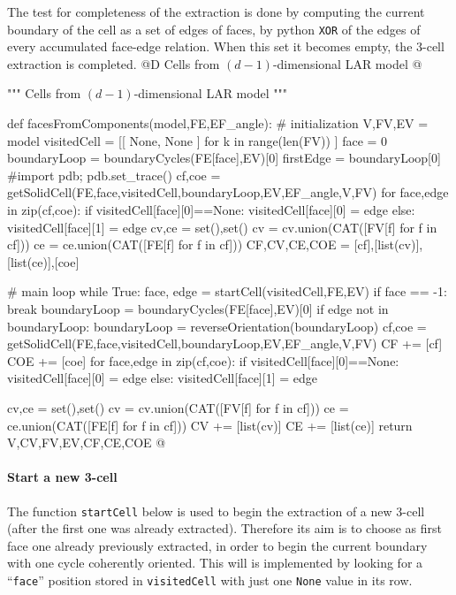 \documentclass[11pt,oneside]{article}    %
\begin{document}
The test for completeness of the extraction is done by computing the current boundary of the cell as a set of edges of faces, by python \texttt{XOR} of the edges of every accumulated face-edge relation. When this set it becomes empty, the 3-cell extraction is completed.
@D Cells from $(d-1)$-dimensional LAR model
@{""" Cells from $(d-1)$-dimensional LAR model """

def facesFromComponents(model,FE,EF_angle):
    # initialization
    V,FV,EV = model
    visitedCell = [[ None, None ] for k in range(len(FV)) ]
    face = 0
    boundaryLoop = boundaryCycles(FE[face],EV)[0]
    firstEdge = boundaryLoop[0]
    #import pdb; pdb.set_trace()
    cf,coe = getSolidCell(FE,face,visitedCell,boundaryLoop,EV,EF_angle,V,FV)
    for face,edge in zip(cf,coe):
        if visitedCell[face][0]==None: visitedCell[face][0] = edge
        else: visitedCell[face][1] = edge
    cv,ce = set(),set()
    cv = cv.union(CAT([FV[f] for f in cf]))
    ce = ce.union(CAT([FE[f] for f in cf]))
    CF,CV,CE,COE = [cf],[list(cv)],[list(ce)],[coe]
    
    # main loop
    while True:
        face, edge = startCell(visitedCell,FE,EV)
        if face == -1: break
        boundaryLoop = boundaryCycles(FE[face],EV)[0]
        if edge not in boundaryLoop:
            boundaryLoop = reverseOrientation(boundaryLoop)
        cf,coe = getSolidCell(FE,face,visitedCell,boundaryLoop,EV,EF_angle,V,FV)
        CF += [cf]
        COE += [coe]
        for face,edge in zip(cf,coe):
            if visitedCell[face][0]==None: visitedCell[face][0] = edge
            else: visitedCell[face][1] = edge
            
        cv,ce = set(),set()
        cv = cv.union(CAT([FV[f] for f in cf]))
        ce = ce.union(CAT([FE[f] for f in cf]))
        CV += [list(cv)]
        CE += [list(ce)]
    return V,CV,FV,EV,CF,CE,COE
@}
    

\paragraph{Start a new 3-cell}
The function \texttt{startCell} below is used to begin the extraction of a new 3-cell (after the first one was already extracted). Therefore its aim is to choose as first face one already previously extracted, in order to begin the current boundary with one cycle coherently oriented. This will is implemented by looking for a ``\texttt{face}'' position stored in \texttt{visitedCell} with just one \texttt{None} value in its row.
\end{document}

